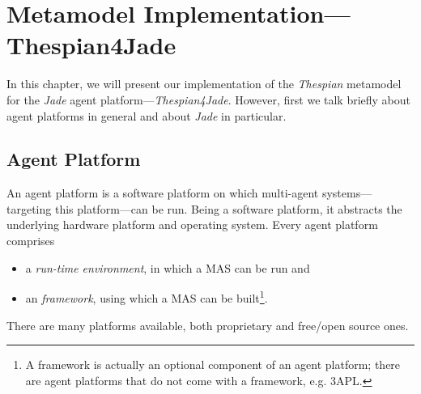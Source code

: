 
\chapter{Metamodel Implementation---Thespian4Jade}

In this chapter, we will present our implementation of the \textit{Thespian} metamodel for the \textit{Jade} agent platform---\textit{Thespian4Jade}.
However, first we talk briefly about agent platforms in general and about \textit{Jade} in particular.

\section{Agent Platform}

An agent platform is a software platform on which multi-agent systems---targeting this platform---can be run.
Being a software platform, it abstracts the underlying hardware platform and operating system.
Every agent platform comprises
\begin{itemize}
	\item a \textit{run-time environment}, in which a MAS can be run and
	\item an \textit{framework}, using which a MAS can be built\footnote{A framework is actually an optional component of an agent platform; there are agent platforms that do not come with a framework, e.g. 3APL.}.
\end{itemize}
There are many platforms available, both proprietary and free/open source ones.


